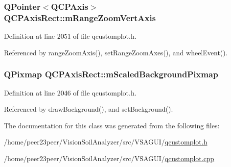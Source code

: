 \subsubsection[{m\+Range\+Zoom\+Vert\+Axis}]{\setlength{\rightskip}{0pt plus 5cm}Q\+Pointer$<${\bf Q\+C\+P\+Axis}$>$ Q\+C\+P\+Axis\+Rect\+::m\+Range\+Zoom\+Vert\+Axis\hspace{0.3cm}{\ttfamily [protected]}}\label{class_q_c_p_axis_rect_a8b9acd16a203a9692bd35a9465f54bc1}


Definition at line 2051 of file qcustomplot.\+h.



Referenced by range\+Zoom\+Axis(), set\+Range\+Zoom\+Axes(), and wheel\+Event().

\hypertarget{class_q_c_p_axis_rect_aa74b9415598d59b49290e41e42d7ee27}{}
\subsubsection[{m\+Scaled\+Background\+Pixmap}]{\setlength{\rightskip}{0pt plus 5cm}Q\+Pixmap Q\+C\+P\+Axis\+Rect\+::m\+Scaled\+Background\+Pixmap\hspace{0.3cm}{\ttfamily [protected]}}\label{class_q_c_p_axis_rect_aa74b9415598d59b49290e41e42d7ee27}


Definition at line 2046 of file qcustomplot.\+h.



Referenced by draw\+Background(), and set\+Background().



The documentation for this class was generated from the following files\+:\begin{DoxyCompactItemize}
\item 
/home/peer23peer/\+Vision\+Soil\+Analyzer/src/\+V\+S\+A\+G\+U\+I/\hyperlink{qcustomplot_8h}{qcustomplot.\+h}\item 
/home/peer23peer/\+Vision\+Soil\+Analyzer/src/\+V\+S\+A\+G\+U\+I/\hyperlink{qcustomplot_8cpp}{qcustomplot.\+cpp}\end{DoxyCompactItemize}
